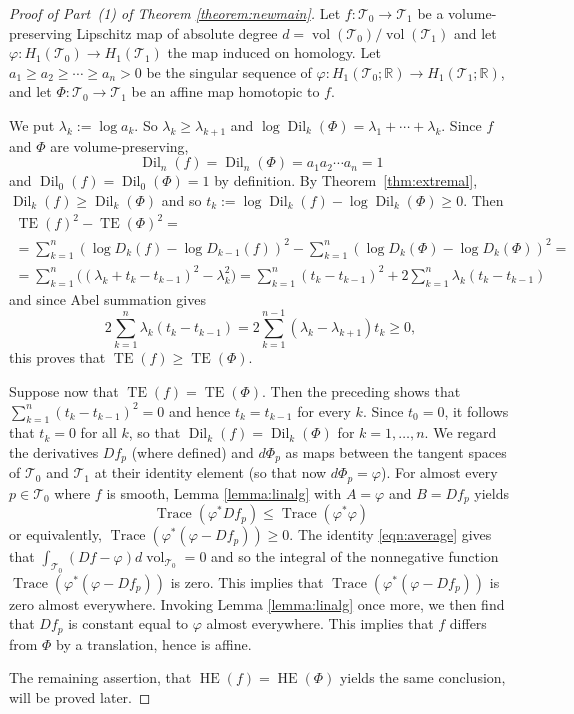 \documentclass[10pt,a4paper]{amsart}
\newcommand{\Dil}{\operatorname{Dil}}
\DeclareMathOperator{\HE}{HE}
\newcommand{\Rb}{\mathbb{R}}
\DeclareMathOperator{\TE}{TE}
\newcommand{\Tc}{\mathcal{T}}
\DeclareMathOperator{\tr}{Trace}
\newcommand{\vol}{\operatorname{vol}}
\begin{document}
\begin{proof}[Proof of Part~(1) of Theorem \ref{theorem:newmain}]
Let $f:  \Tc_0\to \Tc_1$  be  a volume-preserving Lipschitz map of absolute degree $d=\vol(\Tc_0)/\vol(\Tc_1)$ and let $\varphi: H_1(\Tc_0)\to H_1(\Tc_1)$ the map induced on homology.  Let 
$a_1\ge a_2\ge\cdots \ge a_n>0$ be the singular sequence of 
$\varphi: H_1(\Tc_0; \Rb)\to H_1(\Tc_1; \Rb)$, and let $\Phi:\Tc_0\to\Tc_1$ be an affine map homotopic to $f$. 

We put $\lambda_k:=\log a_k$. So $\lambda_k\ge \lambda_{k+1}$ and 
$\log \Dil_k(\Phi)=\lambda_1+\cdots +\lambda_k$. Since  $f$ and $\Phi$ are volume-preserving, 
\[\Dil_n(f)=\Dil_n(\Phi)=a_1a_2\cdots a_n=1\] 
and $\Dil_0(f)=\Dil_0(\Phi)=1$ by definition. 
By Theorem~\ref{thm:extremal}, $\Dil_k(f)\ge \Dil_k(\Phi)$ and so $t_k:=\log  \Dil_k(f)-\log \Dil_k(\Phi) \ge 0$.  Then
\begin{multline*}
\textstyle     \TE(f)^2-\TE(\Phi)^2 =\\
\textstyle = \sum_{k=1}^n (\log D_k(f)-\log D_{k-1}(f) )^2 -  \sum_{k=1}^n (\log D_k(\Phi)-\log D_k(\Phi))^2=\\
\textstyle =\sum_{k=1}^n  \bigl( (\lambda_k+t_k-t_{k-1})^2 -\lambda_k^2  \bigr) =\sum_{k=1}^n (t_k-t_{k-1})^2  +
2\sum_{k=1}^n\lambda_k(t_k-t_{k-1}) 
\end{multline*}
and since Abel summation gives  
\[
\textstyle  2\sum_{k=1}^n\lambda_k(t_k-t_{k-1})=2\sum_{k=1}^{n-1}(\lambda_k -\lambda_{k+1})t_k\ge 0,
\]
 this proves that $\TE(f)\geq \TE(\Phi)$. 

 
Suppose now that $\TE(f)=\TE(\Phi)$. Then the preceding shows that $\sum_{k=1}^n(t_k-t_{k-1})^2=0$ and hence $t_k=t_{k-1}$ for every $k$. Since 
$t_0=0$, it follows that $t_k=0$ for all $k$, so that $\Dil_k(f)=\Dil_k(\Phi)$ for $k=1, \dots ,n$.
We regard the derivatives $Df_p$ (where defined) and $d\Phi_p$ as maps between the tangent spaces of $\Tc_0$ and $\Tc_1$ at their identity element (so that now $d\Phi_p=\varphi$).  For almost every $p\in \Tc_0$ where $f$ is smooth, Lemma \ref{lemma:linalg} with $A=\varphi$ and $B=Df_p$ yields
\begin{equation}\label{eqn:trace-pointwise}
\tr (\varphi^*Df_p)\le \tr (\varphi^*\varphi)
\end{equation}
or  equivalently,  $\tr (\varphi^*(\varphi-Df_p))\ge 0$. The identity   \eqref{eqn:average}  gives that  $\int_{\Tc_0} (Df-\varphi)  d\!\vol_{\Tc_0}=0$
and so the integral of the nonnegative function $\tr (\varphi^*(\varphi-Df_p))$ is zero. This implies that $\tr (\varphi^*(\varphi-Df_p))$ is zero almost everywhere. Invoking Lemma \ref{lemma:linalg} once more, we then find that $Df_p$ is constant equal to 
$\varphi$ almost everywhere. This implies that $f$ differs from $\Phi$ by a translation, hence is affine. 

The remaining assertion,  that  $\HE(f)=\HE(\Phi)$ yields the same conclusion, will be proved later.
\end{proof}
\end{document}
